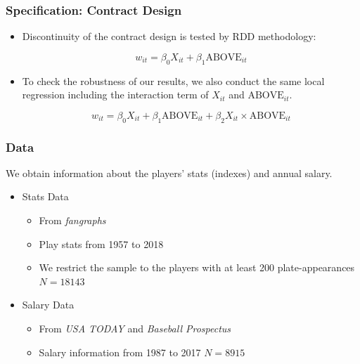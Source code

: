 \documentclass[dvipdfmx,12pt]{beamer}
\begin{document}
\begin{frame}\frametitle{Specification: Contract Design}
  \begin{itemize}
    \item Discontinuity of the contract design is tested by RDD methodology:

    \[
    w_{it} = \beta_0 X_{it} + \beta_1 \text{ABOVE}_{it}
    \]

    \item To check the robustness of our results, we also conduct the same local regression including the interaction term of $X_{it}$ and $\text{ABOVE}_{it}$.

    \[
    w_{it} = \beta_0 X_{it} + \beta_1 \text{ABOVE}_{it} + \beta_2 X_{it} \times \text{ABOVE}_{it}
    \]

  \end{itemize}
\end{frame}

\begin{frame}\frametitle{Data}
  We obtain information about the players' stats (indexes) and annual salary.
  \begin{itemize}
    \item Stats Data
    \begin{itemize}
      \item From \textit{fangraphs}

      \item Play stats from 1957 to 2018

      \item We restrict the sample to the players with at least 200 plate-appearances $N=18143$
    \end{itemize}
    \item Salary Data
    \begin{itemize}
      \item From \textit{USA TODAY} and \textit{Baseball Prospectus}

      \item Salary information from 1987 to 2017 $N=8915$
    \end{itemize}
  \end{itemize}
\end{frame}
\end{document}
